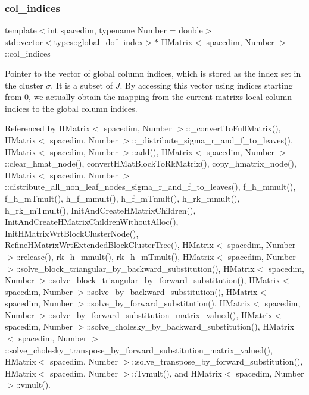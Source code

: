 \mbox{\label{classHMatrix_ac30ae65e37ec5e4ccc7de2f6b9ea91e6}} 
\subsubsection{\texorpdfstring{col\+\_\+indices}{col\_indices}}
{\footnotesize\ttfamily template$<$int spacedim, typename Number = double$>$ \\
std\+::vector$<$types\+::global\+\_\+dof\+\_\+index$>$$\ast$ \hyperlink{classHMatrix}{H\+Matrix}$<$ spacedim, Number $>$\+::col\+\_\+indices\hspace{0.3cm}{\ttfamily [private]}}

Pointer to the vector of global column indices, which is stored as the index set in the cluster $\sigma$. It is a subset of $J$. By accessing this vector using indices starting from 0, we actually obtain the mapping from the current matrix\textquotesingle{}s local column indices to the global column indices. 

Referenced by H\+Matrix$<$ spacedim, Number $>$\+::\+\_\+convert\+To\+Full\+Matrix(), H\+Matrix$<$ spacedim, Number $>$\+::\+\_\+distribute\+\_\+sigma\+\_\+r\+\_\+and\+\_\+f\+\_\+to\+\_\+leaves(), H\+Matrix$<$ spacedim, Number $>$\+::add(), H\+Matrix$<$ spacedim, Number $>$\+::clear\+\_\+hmat\+\_\+node(), convert\+H\+Mat\+Block\+To\+Rk\+Matrix(), copy\+\_\+hmatrix\+\_\+node(), H\+Matrix$<$ spacedim, Number $>$\+::distribute\+\_\+all\+\_\+non\+\_\+leaf\+\_\+nodes\+\_\+sigma\+\_\+r\+\_\+and\+\_\+f\+\_\+to\+\_\+leaves(), f\+\_\+h\+\_\+mmult(), f\+\_\+h\+\_\+m\+Tmult(), h\+\_\+f\+\_\+mmult(), h\+\_\+f\+\_\+m\+Tmult(), h\+\_\+rk\+\_\+mmult(), h\+\_\+rk\+\_\+m\+Tmult(), Init\+And\+Create\+H\+Matrix\+Children(), Init\+And\+Create\+H\+Matrix\+Children\+Without\+Alloc(), Init\+H\+Matrix\+Wrt\+Block\+Cluster\+Node(), Refine\+H\+Matrix\+Wrt\+Extended\+Block\+Cluster\+Tree(), H\+Matrix$<$ spacedim, Number $>$\+::release(), rk\+\_\+h\+\_\+mmult(), rk\+\_\+h\+\_\+m\+Tmult(), H\+Matrix$<$ spacedim, Number $>$\+::solve\+\_\+block\+\_\+triangular\+\_\+by\+\_\+backward\+\_\+substitution(), H\+Matrix$<$ spacedim, Number $>$\+::solve\+\_\+block\+\_\+triangular\+\_\+by\+\_\+forward\+\_\+substitution(), H\+Matrix$<$ spacedim, Number $>$\+::solve\+\_\+by\+\_\+backward\+\_\+substitution(), H\+Matrix$<$ spacedim, Number $>$\+::solve\+\_\+by\+\_\+forward\+\_\+substitution(), H\+Matrix$<$ spacedim, Number $>$\+::solve\+\_\+by\+\_\+forward\+\_\+substitution\+\_\+matrix\+\_\+valued(), H\+Matrix$<$ spacedim, Number $>$\+::solve\+\_\+cholesky\+\_\+by\+\_\+backward\+\_\+substitution(), H\+Matrix$<$ spacedim, Number $>$\+::solve\+\_\+cholesky\+\_\+transpose\+\_\+by\+\_\+forward\+\_\+substitution\+\_\+matrix\+\_\+valued(), H\+Matrix$<$ spacedim, Number $>$\+::solve\+\_\+transpose\+\_\+by\+\_\+forward\+\_\+substitution(), H\+Matrix$<$ spacedim, Number $>$\+::\+Tvmult(), and H\+Matrix$<$ spacedim, Number $>$\+::vmult().

